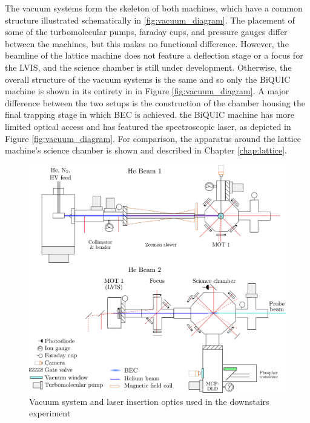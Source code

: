 	The vacuum systems form the skeleton of both machines, which have a common structure illustrated schematically in \ref{fig:vacuum_diagram}.
	The placement of some of the turbomolecular pumps, faraday cups, and pressure gauges differ between the machines, but this makes no functional difference.
	However, the beamline of the lattice machine does not feature a deflection stage or a focus for the LVIS, and the science chamber is still under development.
	Otherwise, the overall structure of the vacuum systems is the same and so only the BiQUIC machine is shown in its entirety in in Figure \ref{fig:vacuum_diagram}.
	A major difference between the two setups is the construction of the chamber housing the final trapping stage in which BEC is achieved.
	the BiQUIC machine has more limited optical access and has featured the spectroscopic laser, as depicted in Figure \ref{fig:vacuum_diagram}.
	For comparison, the apparatus around the lattice machine's science chamber is shown and described in Chapter \ref{chap:lattice}.

		\begin{figure}
		\centering
		\includegraphics[width=\textwidth]{fig/apparatus/vacuum_schematic_simplified}
		\caption{Vacuum system and laser insertion optics used in the downstairs experiment }
		\label{fig:apparatus}
	\end{figure}
	
